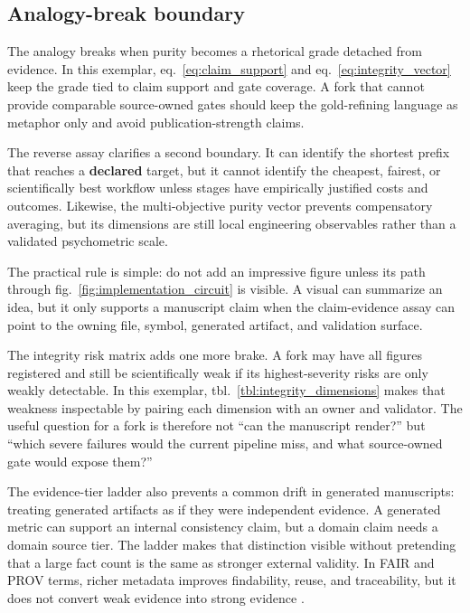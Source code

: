 \documentclass[
  english,
]{article}
\begin{document}
\subsection{Analogy-break boundary}\label{analogy-break-boundary}

The analogy breaks when purity becomes a rhetorical grade detached from
evidence. In this exemplar, eq.~\ref{eq:claim_support} and
eq.~\ref{eq:integrity_vector} keep the grade tied to claim support and
gate coverage. A fork that cannot provide comparable source-owned gates
should keep the gold-refining language as metaphor only and avoid
publication-strength claims.

The reverse assay clarifies a second boundary. It can identify the
shortest prefix that reaches a \textbf{declared} target, but it cannot
identify the cheapest, fairest, or scientifically best workflow unless
stages have empirically justified costs and outcomes. Likewise, the
multi-objective purity vector prevents compensatory averaging, but its
dimensions are still local engineering observables rather than a
validated psychometric scale.

The practical rule is simple: do not add an impressive figure unless its
path through fig.~\ref{fig:implementation_circuit} is visible. A visual
can summarize an idea, but it only supports a manuscript claim when the
claim-evidence assay can point to the owning file, symbol, generated
artifact, and validation surface.

The integrity risk matrix adds one more brake. A fork may have all
figures registered and still be scientifically weak if its
highest-severity risks are only weakly detectable. In this exemplar,
tbl.~\ref{tbl:integrity_dimensions} makes that weakness inspectable by
pairing each dimension with an owner and validator. The useful question
for a fork is therefore not ``can the manuscript render?'' but ``which
severe failures would the current pipeline miss, and what source-owned
gate would expose them?''

The evidence-tier ladder also prevents a common drift in generated
manuscripts: treating generated artifacts as if they were independent
evidence. A generated metric can support an internal consistency claim,
but a domain claim needs a domain source tier. The ladder makes that
distinction visible without pretending that a large fact count is the
same as stronger external validity. In FAIR and PROV terms, richer
metadata improves findability, reuse, and traceability, but it does not
convert weak evidence into strong evidence
\citep{wilkinson2016fair, moreau2013prov}.
\end{document}
